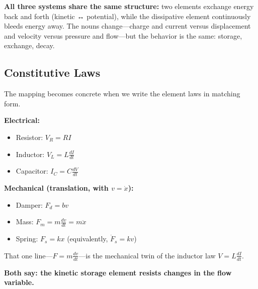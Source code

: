 \documentclass[
]{article}
\providecommand{\tightlist}{%
  \setlength{\itemsep}{0pt}\setlength{\parskip}{0pt}}
\begin{document}
\begin{tcolorbox}[enhanced jigsaw, left=2mm, bottomrule=.15mm, titlerule=0mm, rightrule=.15mm, leftrule=.75mm, colframe=quarto-callout-note-color-frame, opacitybacktitle=0.6, colbacktitle=quarto-callout-note-color!10!white, bottomtitle=1mm, breakable, coltitle=black, toptitle=1mm, arc=.35mm, colback=white, title=\textcolor{quarto-callout-note-color}{\faInfo}\hspace{0.5em}{Note}, opacityback=0, toprule=.15mm]

\textbf{All three systems share the same structure:} two elements
exchange energy back and forth (kinetic ↔ potential), while the
dissipative element continuously bleeds energy away. The nouns
change---charge and current versus displacement and velocity versus
pressure and flow---but the behavior is the same: storage, exchange,
decay.

\end{tcolorbox}

\subsection{Constitutive Laws}\label{constitutive-laws}

The mapping becomes concrete when we write the element laws in matching
form.

\textbf{Electrical:}

\begin{itemize}
\tightlist
\item
  Resistor: \(V_R = RI\)
\item
  Inductor: \(V_L = L\frac{dI}{dt}\)
\item
  Capacitor: \(I_C = C\frac{dV}{dt}\)
\end{itemize}

\textbf{Mechanical (translation, with \(v = \dot{x}\)):}

\begin{itemize}
\tightlist
\item
  Damper: \(F_d = bv\)
\item
  Mass: \(F_m = m\frac{dv}{dt} = m\ddot{x}\)
\item
  Spring: \(F_s = kx\) (equivalently, \(\dot{F}_s = kv\))
\end{itemize}

That one line---\(F = m\frac{dv}{dt}\)---is the mechanical twin of the
inductor law \(V = L\frac{dI}{dt}\).

\textbf{Both say: the kinetic storage element resists changes in the
flow variable.}
\end{document}
